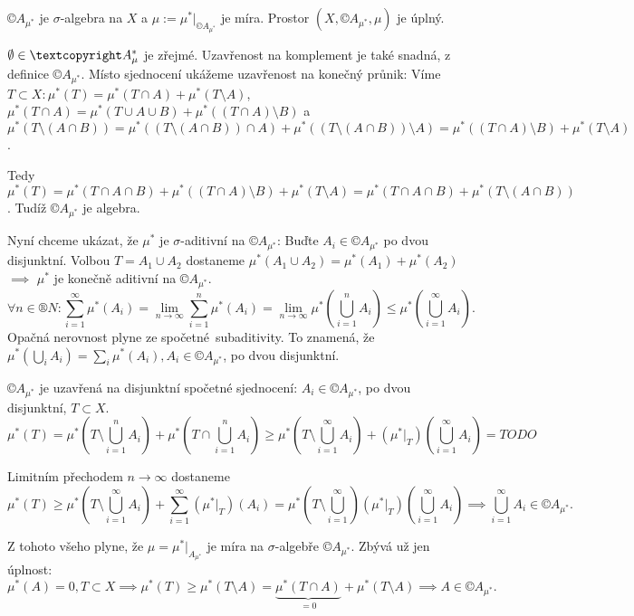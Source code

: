 \documentclass[12pt]{article}					%
\begin{document}
\begin{veta}[Caratheodory]
	$©A_{\mu^*}$ je $\sigma$-algebra na $X$ a $\mu := \mu^*|_{©A_{\mu^*}}$ je míra. Prostor $(X, ©A_{\mu^*}, \mu)$ je úplný.

	\begin{dukazin}
		$\O \in ©A_\mu^*$ je zřejmé. Uzavřenost na komplement je také snadná, z definice $©A_{\mu^*}$. Místo sjednocení ukážeme uzavřenost na konečný průnik: Víme $T \subset X: \mu^*(T) = \mu^*(T\cap A) + \mu^*(T \setminus A)$, $\mu^*(T \cap A) = \mu^*(T \cup A \cup B) + \mu^*((T \cap A) \setminus B)$ a $\mu^*(T\setminus (A \cap B)) = \mu^*((T \setminus (A \cap B)) \cap A) + \mu^*((T \setminus (A \cap B)) \setminus A) = \mu^*((T \cap A) \setminus B) + \mu^*(T \setminus A)$.

		Tedy $\mu^*(T) = \mu^*(T \cap A \cap B) + \mu^*((T \cap A) \setminus B) + \mu^*(T \setminus A) = \mu^*(T \cap A \cap B) + \mu^*(T \setminus (A \cap B))$. Tudíž $©A_{\mu^*}$ je algebra.

		Nyní chceme ukázat, že $\mu^*$ je $\sigma$-aditivní na $©A_{\mu^*}$: Buďte $A_i \in ©A_{\mu^*}$ po dvou disjunktní. Volbou $T = A_1 \cup A_2$ dostaneme $\mu^*(A_1 \cup A_2) = \mu^*(A_1) + \mu^*(A_2)$ $\implies$ $\mu^*$ je konečně aditivní na $©A_{\mu^*}$.
		$$ \forall n \in ®N: \sum_{i=1}^∞ \mu^*(A_i) = \lim_{n \rightarrow ∞} \sum_{i=1}^n \mu^*(A_i) = \lim_{n \rightarrow ∞} \mu^*\left(\bigcup_{i=1}^n A_i\right) ≤ \mu^*\left(\bigcup_{i=1}^∞ A_i\right). $$
		Opačná nerovnost plyne ze spočetné subaditivity. To znamená, že $\mu^*\left(\bigcup_iA_i\right) = \sum_i\mu^*\left(A_i\right), A_i \in ©A_{\mu^*}$, po dvou disjunktní.

		$©A_{\mu^*}$ je uzavřená na disjunktní spočetné sjednocení: $A_i \in ©A_{\mu^*}$, po dvou disjunktní, $T \subset X$.
		$$ \mu^*(T) = \mu^*\left(T \setminus \bigcup_{i=1}^n A_i\right) + \mu^*\left(T \cap \bigcup_{i=1}^n A_i\right) ≥ \mu^*\left(T\setminus \bigcup_{i=1}^∞ A_i\right) + \left(\mu^*|_T\right)\left(\bigcup_{i=1}^∞ A_i\right) = TODO $$

		Limitním přechodem $n \rightarrow ∞$ dostaneme
		$$ \mu^*(T) ≥ \mu^*(T \setminus \bigcup_{i=1}^∞ A_i) + \sum_{i=1}^∞\left(\mu^*|_T\right)\left(A_i\right) = \mu^*\left(T \setminus \bigcup_{i=1}^∞\right) \left(\mu^*|_T\right)\left(\bigcup_{i=1}^∞ A_i\right) \implies \bigcup_{i=1}^∞ A_i \in ©A_{\mu^*}. $$

		Z tohoto všeho plyne, že $\mu = \mu^*|_{A_{\mu^*}}$ je míra na $\sigma$-algebře $©A_{\mu^*}$. Zbývá už jen úplnost:
		$$ \mu^*(A) = 0, T \subset X \implies \mu^*(T) ≥ \mu^*(T\setminus A) = \underbrace{\mu^*(T \cap A)}_{=0} + \mu^*(T \setminus A) \implies A \in ©A_{\mu^*}. $$
	\end{dukazin}
\end{veta}
\end{document}
